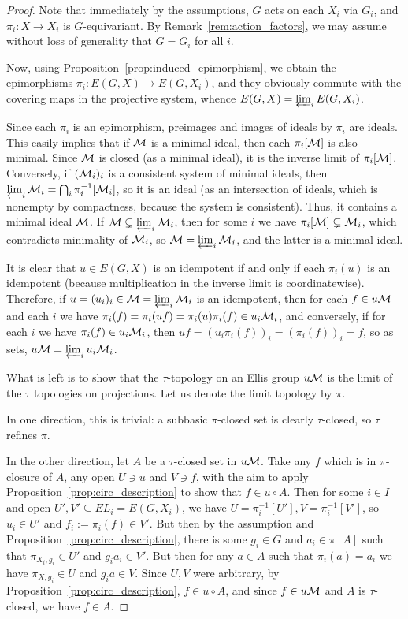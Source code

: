 	\begin{proof}
		Note that immediately by the assumptions, $G$ acts on each $X_i$ via $G_i$, and $\pi_i\colon X\to X_i$ is $G$-equivariant. By Remark~\ref{rem:action_factors}, we may assume without loss of generality that $G=G_i$ for all $i$.
		
		Now, using Proposition~\ref{prop:induced_epimorphism}, we obtain the epimorphisms $\pi_i\colon E(G,X)\to E(G,X_i)$, and they obviously commute with the covering maps in the projective system, whence $E(G,X)=\varprojlim_i E(G,X_i)$.
		
		Since each $\pi_i$ is an epimorphism, preimages and images of ideals by $\pi_i$ are ideals. This easily implies that if ${\mathcal M}$ is a minimal ideal, then each $\pi_i[{\mathcal M}]$ is also minimal. Since ${\mathcal M}$ is closed (as a minimal ideal), it is the inverse limit of $\pi_i[{\mathcal M}]$. Conversely, if $({\mathcal M}_i)_i$ is a consistent system of minimal ideals, then $\varprojlim_i {\mathcal M}_i=\bigcap_i \pi_i^{-1}[{\mathcal M}_i]$, so it is an ideal (as an intersection of ideals, which is nonempty by compactness, because the system is consistent). Thus, it contains a minimal ideal ${\mathcal M}$. If ${\mathcal M}\subsetneq \varprojlim_i {\mathcal M}_i$, then for some $i$ we have $\pi_i[{\mathcal M}]\subsetneq {\mathcal M}_i$, which contradicts minimality of ${\mathcal M}_i$, so ${\mathcal M}= \varprojlim_i {\mathcal M}_i$, and the latter is a minimal ideal.
		
		It is clear that $u\in E(G,X)$ is an idempotent if and only if each $\pi_i(u)$ is an idempotent (because multiplication in the inverse limit is coordinatewise). Therefore, if $u=(u_i)_i\in {\mathcal M}=\varprojlim_i {\mathcal M}_i$ is an idempotent, then for each $f\in u{\mathcal M}$ and each $i$ we have $\pi_i(f)=\pi_i(uf)=\pi_i(u)\pi_i(f)\in u_i {\mathcal M}_i$, and conversely, if for each $i$ we have $\pi_i(f)\in u_i{\mathcal M}_i$, then $uf=(u_i\pi_i(f))_i=(\pi_i(f))_i=f$, so as sets, $u{\mathcal M}=\varprojlim_i u_i{\mathcal M}_i$.
		
		What is left is to show that the $\tau$-topology on an Ellis group $u{\mathcal M}$ is the limit of the $\tau$ topologies on projections. Let us denote the limit topology by $\pi$.
		
		In one direction, this is trivial: a subbasic $\pi$-closed set is clearly $\tau$-closed, so $\tau$ refines $\pi$.
		
		In the other direction, let $A$ be a $\tau$-closed set in $u{\mathcal M}$. Take any $f$ which is in $\pi$-closure of $A$, any open $U\ni u$ and $V\ni f$, with the aim to apply Proposition~\ref{prop:circ_description} to show that $f\in u\circ A$. Then for some $i\in I$ and open $U',V'\subseteq EL_i=E(G,X_i)$, we have $U=\pi_i^{-1}[U'],V=\pi_i^{-1}[V']$, so $u_i\in U'$ and $f_i:=\pi_i(f)\in V'$. But then by the assumption and Proposition~\ref{prop:circ_description}, there is some $g_i\in G$ and $a_i\in \pi[A]$ such that $\pi_{X_i,g_i}\in U'$ and $g_ia_i\in V'$. But then for any $a\in A$ such that $\pi_i(a)=a_i$ we have $\pi_{X,g_i}\in U$ and $g_ia\in V$. Since $U,V$ were arbitrary, by Proposition~\ref{prop:circ_description}, $f\in u\circ A$, and since $f\in u{\mathcal M}$ and $A$ is $\tau$-closed, we have $f\in A$.
	\end{proof}
	

